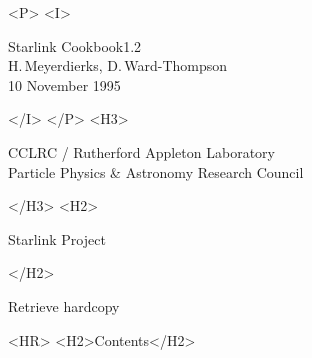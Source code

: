 \documentclass[11pt]{article}
\newcommand{\stardoccategory}  {Starlink Cookbook}
\newcommand{\stardocinitials}  {SC}
\newcommand{\stardocsource}    {sc1.2}
\newcommand{\stardocnumber}    {1.2}
\newcommand{\stardocauthors}   {H.\,Meyerdierks, D.\,Ward-Thompson}
\newcommand{\stardocdate}      {10 November 1995}
\newcommand{\stardocname}{\stardocinitials /\stardocnumber}
\newcommand{\htmladdnormallink}[2]{#1}
\newcommand{\htmladdimg}[1]{}
\newenvironment{latexonly}{}{}
\newcommand{\htmlref}[2]{#1}
\newcommand{\htmladdtonavigation}[1]{}
\newcommand{\xlabel}[1]{}
\newcommand{\latexonlytoc}[0]{\tableofcontents}
\renewcommand{\thepage}{\roman{page}}
\begin{document}
\begin{htmlonly}
   \begin{rawhtml} <P> <I> \end{rawhtml}
   \stardoccategory \stardocnumber \\
   \stardocauthors \\
   \stardocdate
   \begin{rawhtml} </I> </P> <H3> \end{rawhtml}
      \htmladdnormallink{CCLRC}{http://www.cclrc.ac.uk} /
      \htmladdnormallink{Rutherford Appleton Laboratory}
                        {http://www.cclrc.ac.uk/ral} \\
      \htmladdnormallink{Particle Physics \& Astronomy Research Council}
                        {http://www.pparc.ac.uk} \\
   \begin{rawhtml} </H3> <H2> \end{rawhtml}
      \htmladdnormallink{Starlink Project}{http://www.starlink.ac.uk/}
   \begin{rawhtml} </H2> \end{rawhtml}
   \htmladdnormallink{\htmladdimg{source.gif} Retrieve hardcopy}
      {http://www.starlink.ac.uk/cgi-bin/hcserver?\stardocsource}\\

  \label{stardoccontents}
  \begin{rawhtml}
    <HR>
    <H2>Contents</H2>
  \end{rawhtml}
  \renewcommand{\latexonlytoc}[0]{}
  \htmladdtonavigation{\htmlref{\htmladdimg{contents_motif.gif}}
        {stardoccontents}}

\end{htmlonly}

 \newpage
 \begin{latexonly}
   \setlength{\parskip}{0mm}
   \latexonlytoc
   \setlength{\parskip}{\medskipamount}
   \markright{\stardocname}
 \end{latexonly}
\newpage
\renewcommand{\thepage}{\arabic{page}}
\setcounter{page}{1}
\end{document}
